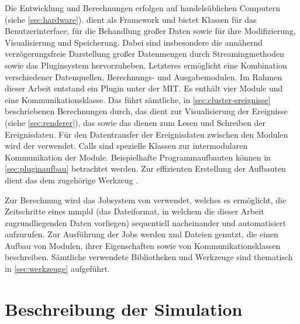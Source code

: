 Die Entwicklung und Berechnungen erfolgen auf handelsüblichen Computern (siehe \autoref{sec:hardware}).  dient als Framework und bietet Klassen für das Benutzerinterface, für die Behandlung großer Daten sowie für ihre Modifizierung, Visualisierung und Speicherung. Dabei sind insbesondere die annähernd verzögerungsfreie Darstellung großer Datenmengen durch Streamingmethoden sowie das Pluginsystem hervorzuheben. Letzteres ermöglicht eine Kombination verschiedener Datenquellen, Berechnungs- und Ausgabemodulen. Im Rahmen dieser Arbeit entstand ein Plugin unter der \gls{MIT}. Es enthält vier Module und eine Kommunikationsklasse. Das  führt sämtliche, in \autoref{sec:cluster-ereignisse} beschriebenen Berechnungen durch, das  dient zur Visualisierung der Ereignisse (siehe \autoref{sec:renderer}), das  sowie das  dienen zum Lesen und Schreiben der Ereignisdaten. Für den Datentransfer der Ereignisdaten zwischen den Modulen wird der  verwendet. Calls sind spezielle Klassen zur intermodularen Kommunikation der  Module. Beispielhafte Programmaufbauten können in \autoref{sec:pluginaufbau} betrachtet werden. Zur effizienten Erstellung der Aufbauten dient das dem  zugehörige Werkzeug .

Zur Berechnung wird das Jobsystem von  verwendet, welches es ermöglicht, die Zeitschritte eines \gls{mmpld} (das Dateiformat, in welchem die dieser Arbeit zugrundliegenden Daten vorliegen) sequentiell nacheinander und automatisiert aufzurufen. Zur Ausführung der Jobs werden \gls{xml} Dateien genutzt, die einen Aufbau von Modulen, ihrer Eigenschaften sowie von Kommunikationsklassen beschreiben. Sämtliche verwendete Bibliotheken und Werkzeuge sind thematisch in \autoref{sec:werkzeuge} aufgeführt.



\section{Beschreibung der Simulation}\label{sec:simulation}

